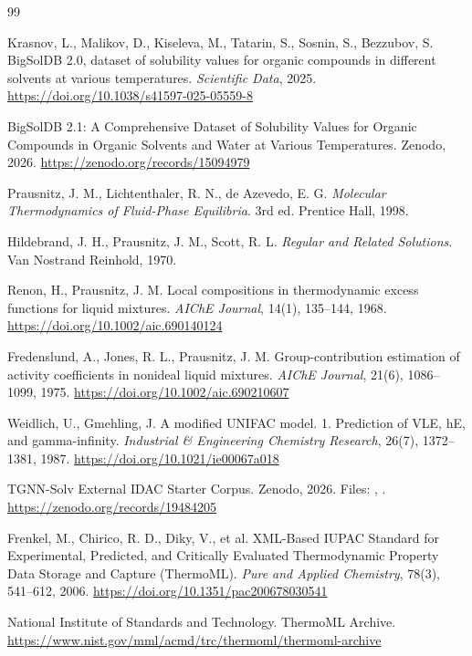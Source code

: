 \documentclass[11pt]{article}
\DeclareRobustCommand{\code}[1]{\texttt{\detokenize{#1}}}
\begin{document}
\begin{thebibliography}{99}

 Krasnov, L., Malikov, D., Kiseleva, M., Tatarin, S., Sosnin, S., Bezzubov, S. BigSolDB 2.0, dataset of solubility values for organic compounds in different solvents at various temperatures. \textit{Scientific Data}, 2025. \url{https://doi.org/10.1038/s41597-025-05559-8}

 BigSolDB 2.1: A Comprehensive Dataset of Solubility Values for Organic Compounds in Organic Solvents and Water at Various Temperatures. Zenodo, 2026. \url{https://zenodo.org/records/15094979}

 Prausnitz, J. M., Lichtenthaler, R. N., de Azevedo, E. G. \textit{Molecular Thermodynamics of Fluid-Phase Equilibria}. 3rd ed. Prentice Hall, 1998.

 Hildebrand, J. H., Prausnitz, J. M., Scott, R. L. \textit{Regular and Related Solutions}. Van Nostrand Reinhold, 1970.

 Renon, H., Prausnitz, J. M. Local compositions in thermodynamic excess functions for liquid mixtures. \textit{AIChE Journal}, 14(1), 135--144, 1968. \url{https://doi.org/10.1002/aic.690140124}

 Fredenslund, A., Jones, R. L., Prausnitz, J. M. Group-contribution estimation of activity coefficients in nonideal liquid mixtures. \textit{AIChE Journal}, 21(6), 1086--1099, 1975. \url{https://doi.org/10.1002/aic.690210607}

 Weidlich, U., Gmehling, J. A modified UNIFAC model. 1. Prediction of VLE, hE, and gamma-infinity. \textit{Industrial \& Engineering Chemistry Research}, 26(7), 1372--1381, 1987. \url{https://doi.org/10.1021/ie00067a018}

 TGNN-Solv External IDAC Starter Corpus. Zenodo, 2026. Files: \code{idac.csv}, \code{idac_seed_dois.txt}. \url{https://zenodo.org/records/19484205}

 Frenkel, M., Chirico, R. D., Diky, V., et al. XML-Based IUPAC Standard for Experimental, Predicted, and Critically Evaluated Thermodynamic Property Data Storage and Capture (ThermoML). \textit{Pure and Applied Chemistry}, 78(3), 541--612, 2006. \url{https://doi.org/10.1351/pac200678030541}

 National Institute of Standards and Technology. ThermoML Archive. \url{https://www.nist.gov/mml/acmd/trc/thermoml/thermoml-archive}


\end{thebibliography}
\end{document}

